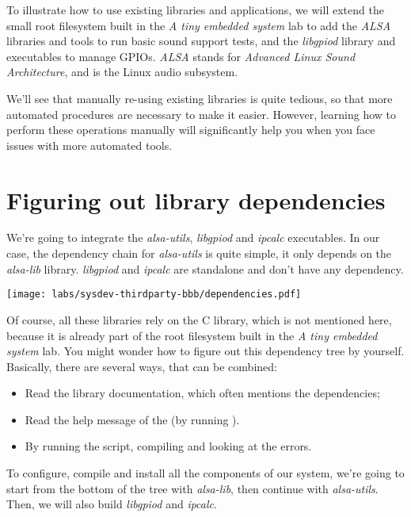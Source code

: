 
To illustrate how to use existing libraries and applications, we will
extend the small root filesystem built in the {\em A tiny embedded
system} lab to add the {\em ALSA} libraries and tools to run
basic sound support tests, and the {\em libgpiod} library and
executables to manage GPIOs. {\em ALSA} stands for {\em Advanced Linux
Sound Architecture}, and is the Linux audio subsystem.

We'll see that manually re-using existing libraries is quite tedious,
so that more automated procedures are necessary to make it
easier. However, learning how to perform these operations manually
will significantly help you when you face issues with more
automated tools.

\section{Figuring out library dependencies}

We're going to integrate the {\em alsa-utils}, {\em libgpiod}
and {\em ipcalc} executables. In our case, the dependency chain
for {\em alsa-utils} is quite simple, it only depends on the
{\em alsa-lib} library. {\em libgpiod} and {\em ipcalc} are standalone
and don't have any dependency.

\texttt{[image: labs/sysdev-thirdparty-bbb/dependencies.pdf]}

Of course, all these libraries rely on the C library, which is not
mentioned here, because it is already part of the root filesystem
built in the {\em A tiny embedded system} lab. You might wonder how to
figure out this dependency tree by yourself. Basically, there are
several ways, that can be combined:

\begin{itemize}
\item Read the library documentation, which often mentions the
  dependencies;
\item Read the help message of the  (by running
  ).
\item By running the  script, compiling and looking
  at the errors.
\end{itemize}

To configure, compile and install all the components of our system,
we're going to start from the bottom of the tree with {\em alsa-lib},
then continue with {\em alsa-utils}. Then, we will also build
{\em libgpiod} and {\em ipcalc}.

